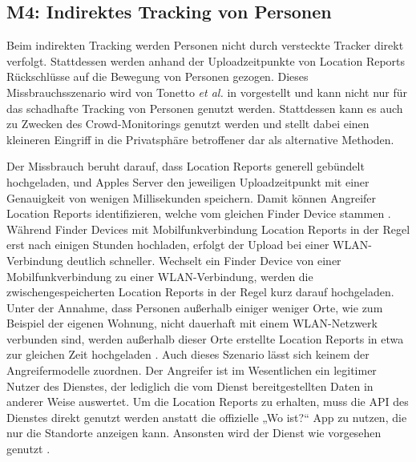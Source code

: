 \subsection[M4]{M4: Indirektes Tracking von Personen}
\label{missbrauch:4}
Beim indirekten Tracking werden Personen nicht durch versteckte Tracker direkt verfolgt.
Stattdessen werden anhand der Uploadzeitpunkte von Location Reports Rückschlüsse auf die Bewegung von Personen gezogen.
Dieses Missbrauchsszenario wird von Tonetto \textit{et al.} in \cite{Tonetto_FindMy} vorgestellt und kann nicht nur für das schadhafte Tracking von Personen genutzt werden.
Stattdessen kann es auch zu Zwecken des Crowd-Monitorings genutzt werden und stellt dabei einen kleineren Eingriff in die Privatsphäre betroffener dar als alternative Methoden. 

Der Missbrauch beruht darauf, dass Location Reports generell gebündelt hochgeladen, und Apples Server den jeweiligen Uploadzeitpunkt mit einer Genauigkeit von wenigen Millisekunden speichern.
Damit können Angreifer Location Reports identifizieren, welche vom gleichen Finder Device stammen \cite{Tonetto_FindMy}.
Während Finder Devices mit Mobilfunkverbindung Location Reports in der Regel erst nach einigen Stunden hochladen, erfolgt der Upload bei einer WLAN-Verbindung deutlich schneller.
Wechselt ein Finder Device von einer Mobilfunkverbindung zu einer WLAN-Verbindung, werden die zwischengespeicherten Location Reports in der Regel kurz darauf hochgeladen.
Unter der Annahme, dass Personen außerhalb einiger weniger Orte, wie zum Beispiel der eigenen Wohnung, nicht dauerhaft mit einem WLAN-Netzwerk verbunden sind, werden außerhalb dieser Orte erstellte Location Reports in etwa zur gleichen Zeit hochgeladen \cite{Tonetto_FindMy}.
Auch dieses Szenario lässt sich keinem der Angreifermodelle zuordnen. 
Der Angreifer ist im Wesentlichen ein legitimer Nutzer des Dienstes, der lediglich die vom Dienst bereitgestellten Daten in anderer Weise auswertet.
Um die Location Reports zu erhalten, muss die \ac{API} des Dienstes direkt genutzt werden anstatt die offizielle „Wo ist?“ App zu nutzen, die nur die Standorte anzeigen kann.
Ansonsten wird der Dienst wie vorgesehen genutzt \cite{Tonetto_FindMy}.

